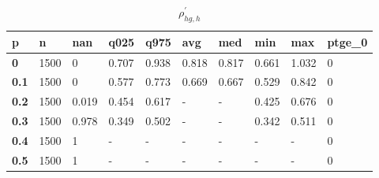\begin{table}[h]
 \centering 
\footnotesize
\caption{$\rho_{hg,h}^\prime $}
\label{tab:alphahgh}
\begin{tabular}[h]{|l|l|l|l|l|l|l|l|l|l|
    } \hline
\textbf{ p} & \textbf{ n} & \textbf{ nan} & \textbf{ q025} & \textbf{ q975} & \textbf{ avg} & \textbf{ med} & \textbf{ min} & \textbf{ max} & \textbf{ ptge\_0}
    \\ \hline
  \textbf{  0} & 1500 &     0 & 0.707 & 0.938 & 0.818 & 0.817 & 0.661 & 1.032 & 0
    \\ \hline
  \textbf{0.1} & 1500 &     0 & 0.577 & 0.773 & 0.669 & 0.667 & 0.529 & 0.842 & 0
    \\ \hline
  \textbf{0.2} & 1500 & 0.019 & 0.454 & 0.617 & - & - & 0.425 & 0.676 & 0
    \\ \hline
  \textbf{0.3} & 1500 & 0.978 & 0.349 & 0.502 & - & - & 0.342 & 0.511 & 0
    \\ \hline
  \textbf{0.4} & 1500 &     1 & - & - & - & - & - & - & 0
    \\ \hline
  \textbf{0.5} & 1500 &     1 & - & - & - & - & - & - & 0
    \\ \hline
 \end{tabular}
 \end{table}

